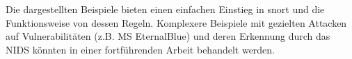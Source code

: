Die dargestellten Beispiele bieten einen einfachen Einstieg in snort und die Funktionsweise von dessen Regeln. Komplexere Beispiele mit gezielten Attacken auf Vulnerabilitäten (z.B. MS EternalBlue) und deren Erkennung durch das NIDS könnten in einer fortführenden Arbeit behandelt werden.
